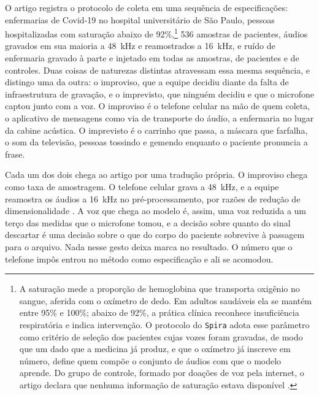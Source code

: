 O artigo registra o protocolo de coleta em uma sequência de especificações: enfermarias de Covid-19 no hospital universitário de São Paulo, pessoas hospitalizadas com saturação abaixo de 92\%,\footnote{A saturação mede a proporção de hemoglobina que transporta oxigênio no sangue, aferida com o oxímetro de dedo. Em adultos saudáveis ela se mantém entre 95\% e 100\%; abaixo de 92\%, a prática clínica reconhece insuficiência respiratória e indica intervenção. O protocolo do \texttt{Spira} adota esse parâmetro como critério de seleção dos pacientes cujas vozes foram gravadas, de modo que um dado que a medicina já produz, e que o oxímetro já inscreve em número, define quem compõe o conjunto de áudios com que o modelo aprende. Do grupo de controle, formado por doações de voz pela internet, o artigo declara que nenhuma informação de saturação estava disponível \parencite{Casanova2021DeepLearning}.} 536 amostras de pacientes, áudios gravados em sua maioria a 48~kHz e reamostrados a 16~kHz, e ruído de enfermaria gravado à parte e injetado em todas as amostras, de pacientes e de controles. Duas coisas de naturezas distintas atravessam essa mesma sequência, e distingo uma da outra: o improviso, que a equipe decidiu diante da falta de infraestrutura de gravação, e o imprevisto, que ninguém decidiu e que o microfone captou junto com a voz. O improviso é o telefone celular na mão de quem coleta, o aplicativo de mensagens como via de transporte do áudio, a enfermaria no lugar da cabine acústica. O imprevisto é o carrinho que passa, a máscara que farfalha, o som da televisão, pessoas tossindo e gemendo enquanto o paciente pronuncia a frase.

Cada um dos dois chega ao artigo por uma tradução própria. O improviso chega como taxa de amostragem. O telefone celular grava a 48~kHz, e a equipe reamostra os áudios a 16~kHz no pré-processamento, por razões de redução de dimensionalidade \parencite{Casanova2021DeepLearning}. A voz que chega ao modelo é, assim, uma voz reduzida a um terço das medidas que o microfone tomou, e a decisão sobre quanto do sinal descartar é uma decisão sobre o que do corpo do paciente sobrevive à passagem para o arquivo. Nada nesse gesto deixa marca no resultado. O número que o telefone impôs entrou no método como especificação e ali se acomodou.

